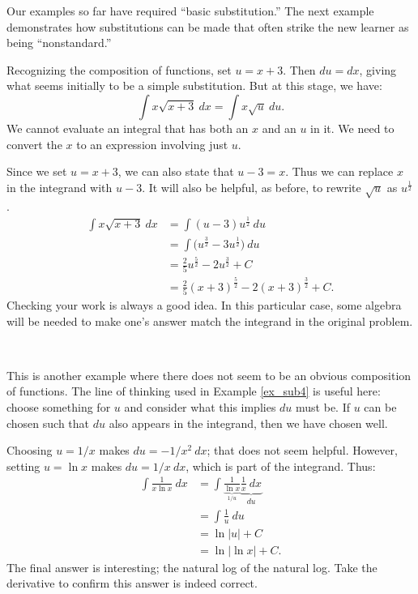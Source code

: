 Our examples so far have required ``basic substitution.'' The next example demonstrates how substitutions can be made that often strike the new learner as being ``nonstandard.''\\


{Recognizing the composition of functions, set $u = x+3$. Then $du = dx$, giving what seems initially to be a simple substitution. But at this stage, we have:
	$$\int x\sqrt{x+3}\ dx = \int x\sqrt{u}\ du.$$
We cannot evaluate an integral that has both an $x$ and an $u$ in it. We need to convert the $x$ to an expression involving just $u$.

Since we set $u = x+3$, we can also state that $u-3 = x$. Thus we can replace $x$ in the integrand with $u-3$. It will also be helpful, as before, to rewrite $\sqrt{u}$ as $u^\frac12$.
\begin{align*}
		\int x\sqrt{x+3} \ dx &= \int (u-3)u^\frac12\ du \\
											&= \int \big(u^\frac32 - 3u^\frac12\big) \ du \\
											&= \frac25u^\frac52 - 2u^\frac32 + C \\
											&= \frac25(x+3)^\frac52 - 2(x+3)^\frac32 + C.
\end{align*}
Checking your work is always a good idea. In this particular case, some algebra will be needed to make one's answer match the integrand in the original problem.
}\\

{This is another example where there does not seem to be an obvious composition of functions. The line of thinking used in Example \ref{ex_sub4} is useful here: choose something for $u$ and consider what this implies $du$ must be. If $u$ can be chosen such that $du$ also appears in the integrand, then we have chosen well.

Choosing $u = 1/x$ makes $du = -1/x^2\ dx$; that does not seem helpful. However, setting $u = \ln x$ makes $du = 1/x\ dx$, which is part of the integrand. Thus:
\begin{align*}
	\int \frac1{x\ln x}\ dx 	&=	\int \frac{1}{\underbrace{\ln x}_{1/u}}\underbrace{\frac1x\ dx}_{du} \\
												&= \int \frac1u\ du \\
												&= \ln |u| + C \\
												&= \ln | \ln x| + C.
\end{align*}
The final answer is interesting; the natural log of the natural log. Take the derivative to confirm this answer is indeed correct.
}\\

